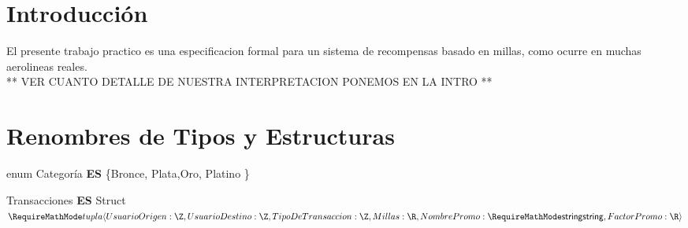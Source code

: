 \documentclass[11pt,a4paper]{article}
\newcommand{\Tipo}[1]{\mathsf{#1}}
\begin{document}
\maketitle
\section{Introducción}

El presente trabajo practico es una especificacion formal para un sistema de recompensas basado en millas, como ocurre en muchas aerolineas reales.
\\
** VER CUANTO DETALLE DE NUESTRA INTERPRETACION PONEMOS EN LA INTRO **

\section{Renombres de Tipos y Estructuras}

\noindent enum Categoría \textbf{ES} \{Bronce, Plata,Oro, Platino  \}

\vspace{0.5cm}

\noindent Transacciones \textbf{ES} Struct $\tupla{
		UsuarioOrigen: \Tipo{\Z}, \\
		UsuarioDestino: \Tipo{\Z},
		TipoDeTransaccion: \Tipo{\Z},
		Millas: \Tipo{\R}, \\
		NombrePromo: \Tipo{\str},
		FactorPromo: \Tipo{\R}
	}$

\noindent {}

\vspace{2em}
\end{document}
